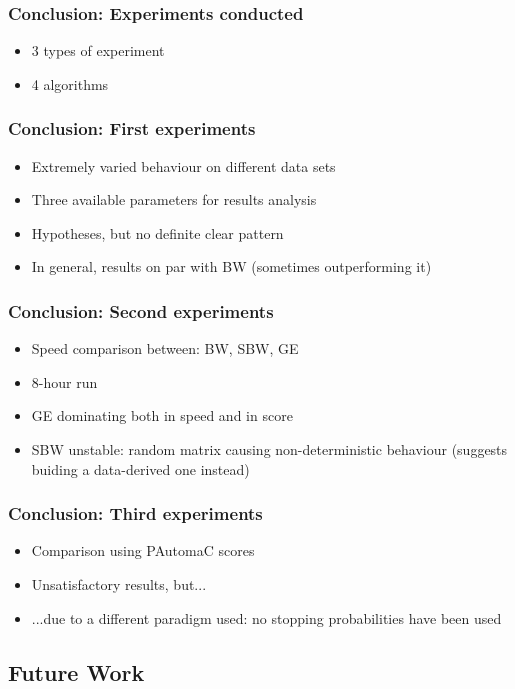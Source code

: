 \begin{frame}
  \frametitle{Conclusion: Experiments conducted}
  \begin{itemize}
  	\item 3 types of experiment
  	\item 4 algorithms
  \end{itemize}
\end{frame}

\begin{frame}
  \frametitle{Conclusion: First experiments}
  \begin{itemize}
  	\item Extremely varied behaviour on different data sets
  	\item Three available parameters for results analysis
  	\item Hypotheses, but no definite clear pattern
  	\item In general, results on par with BW (sometimes outperforming it)
  \end{itemize}
\end{frame}

\begin{frame}
  \frametitle{Conclusion: Second experiments}
  \begin{itemize}
  	\item Speed comparison between: BW, SBW, GE
  	\item 8-hour run
  	\item GE dominating both in speed and in score
  	\item SBW unstable: random matrix causing non-deterministic behaviour (suggests buiding a data-derived one instead)
  \end{itemize}
\end{frame}

\begin{frame}
  \frametitle{Conclusion: Third experiments}
  \begin{itemize}
  	\item Comparison using PAutomaC scores
  	\item Unsatisfactory results, but...
  	\item ...due to a different paradigm used: no stopping probabilities have been used
  \end{itemize}
\end{frame}

\subsection{Future Work}

